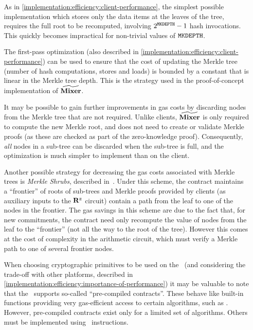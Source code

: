 As in \cref{implementation:efficiency:client-performance}, the simplest possible implementation which stores only the data items at the leaves of the tree, requires the full root to be recomputed, involving $2^{\mathtt{MKDEPTH}} - 1$ hash invocations. This quickly becomes impractical for non-trivial values of $\mathtt{MKDEPTH}$.

The first-pass optimization (also described in \cref{implementation:efficiency:client-performance}) can be used to ensure that the cost of updating the Merkle tree (number of hash computations, stores and loads) is bounded by a constant that is linear in the Merkle tree depth. This is the strategy used in the proof-of-concept implementation of $\widetilde{\mathbf{Mixer}}$.

It may be possible to gain further improvements in gas costs by discarding nodes from the Merkle tree that are not required. Unlike clients, $\widetilde{\mathbf{Mixer}}$ is only required to compute the new Merkle root, and does not need to create or validate Merkle proofs (as these are checked as part of the zero-knowledge proof). Consequently, \emph{all} nodes in a sub-tree can be discarded when the sub-tree is full, and the optimization is much simpler to implement than on the client.

Another possible strategy for decreasing the gas costs associated with Merkle trees is \emph{Merkle Shrubs}, described in~\cite[Section 2.2]{merkle-shrubs}. Under this scheme, the contract maintains a ``frontier'' of roots of sub-trees and Merkle proofs provided by clients (as auxiliary inputs to the $\mathbf{R}^{\texttt{z}}$ circuit) contain a path from the leaf to one of the nodes in the frontier. The gas savings in this scheme are due to the fact that, for new commitments, the contract need only recompute the value of nodes from the leaf to the ``frontier'' (not all the way to the root of the tree). However this comes at the cost of complexity in the arithmetic circuit, which must verify a Merkle path to one of several frontier nodes.

When choosing cryptographic primitives to be used on the \evm~(and considering the trade-off with other platforms, described in \cref{implementation:efficiency:importance-of-performance}) it may be valuable to note that the \evm~supports so-called ``pre-compiled contracts''. These behave like built-in functions providing very gas-efficient access to certain algorithms, such as \keccak. However, pre-compiled contracts exist only for a limited set of algorithms. Others must be implemented using \evm~instructions.

